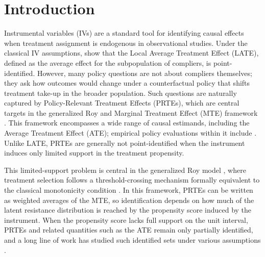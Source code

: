 ﻿\section{Introduction}

Instrumental variables (IVs) are a standard tool for identifying causal effects when treatment assignment is endogenous in observational studies. Under the classical IV assumptions, \citet{angrist1995identification} show that the Local Average Treatment Effect (LATE), defined as the average effect for the subpopulation of compliers, is point-identified. However, many policy questions are not about compliers themselves; they ask how outcomes would change under a counterfactual policy that shifts treatment take-up in the broader population. Such questions are naturally captured by Policy-Relevant Treatment Effects (PRTEs), which are central targets in the generalized Roy and Marginal Treatment Effect (MTE) framework \citep{heckman1999local,heckman2005structural,heckman2006understanding}. This framework encompasses a wide range of causal estimands, including the Average Treatment Effect (ATE); empirical policy evaluations within it include \citet{carneiro2010evaluating,carneiro2011estimating}. Unlike LATE, PRTEs are generally not point-identified when the instrument induces only limited support in the treatment propensity.


This limited-support problem is central in the generalized Roy model \citep{heckman2005structural}, where treatment selection follows a threshold-crossing mechanism formally equivalent to the classical monotonicity condition \citep{angrist1995identification,vytlacil2002independence}. In this framework, PRTEs can be written as weighted averages of the MTE, so identification depends on how much of the latent resistance distribution is reached by the propensity score induced by the instrument. When the propensity score lacks full support on the unit interval, PRTEs and related quantities such as the ATE remain only partially identified, and a long line of work has studied such identified sets under various assumptions \citep{manski1990nonparametric,manski1997monotone,manski_pepper2000monotone,heckman2001instrumental,magne2018using}. 

